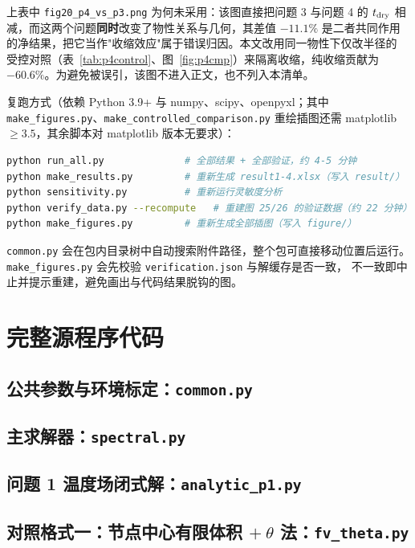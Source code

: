 \documentclass[bwprint]{cumcmthesis}
\begin{document}
上表中 \texttt{fig20\_p4\_vs\_p3.png} 为何未采用：该图直接把问题 3 与问题 4 的
$t_{\rm dry}$ 相减，而这两个问题\textbf{同时}改变了物性关系与几何，其差值 $-11.1\%$
是二者共同作用的净结果，把它当作"收缩效应"属于错误归因。本文改用同一物性下仅改半径的
受控对照（表~\ref{tab:p4control}、图~\ref{fig:p4cmp}）来隔离收缩，纯收缩贡献为
$-60.6\%$。为避免被误引，该图不进入正文，也不列入本清单。

复跑方式（依赖 Python 3.9+ 与 numpy、scipy、openpyxl；其中
\texttt{make\_figures.py}、\texttt{make\_controlled\_comparison.py} 重绘插图还需
matplotlib $\ge 3.5$，其余脚本对 matplotlib 版本无要求）：
\begin{lstlisting}[language=bash]
python run_all.py              # 全部结果 + 全部验证，约 4-5 分钟
python make_results.py         # 重新生成 result1-4.xlsx（写入 result/）
python sensitivity.py          # 重新运行灵敏度分析
python verify_data.py --recompute   # 重建图 25/26 的验证数据（约 22 分钟）
python make_figures.py         # 重新生成全部插图（写入 figure/）
\end{lstlisting}
\texttt{common.py} 会在包内目录树中自动搜索附件路径，整个包可直接移动位置后运行。
\texttt{make\_figures.py} 会先校验 \texttt{verification.json} 与解缓存是否一致，
不一致即中止并提示重建，避免画出与代码结果脱钩的图。

\section{完整源程序代码}

\subsection{公共参数与环境标定：\texttt{common.py}}


\subsection{主求解器：\texttt{spectral.py}}


\subsection{问题 1 温度场闭式解：\texttt{analytic\_p1.py}}


\subsection{对照格式一：节点中心有限体积 $+\ \theta$ 法：\texttt{fv\_theta.py}}

\end{document}
